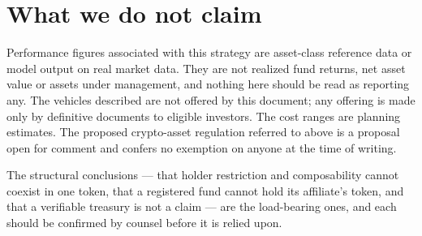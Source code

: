 \documentclass[11pt,a4paper]{article}
\begin{document}
\section{What we do not claim}

Performance figures associated with this strategy are asset-class reference data
or model output on real market data. They are not realized fund returns, net asset
value or assets under management, and nothing here should be read as reporting
any. The vehicles described are not offered by this document; any offering is made
only by definitive documents to eligible investors. The cost ranges are planning
estimates. The proposed crypto-asset regulation referred to above is a proposal
open for comment and confers no exemption on anyone at the time of writing.

The structural conclusions --- that holder restriction and composability cannot
coexist in one token, that a registered fund cannot hold its affiliate's token,
and that a verifiable treasury is not a claim --- are the load-bearing ones, and
each should be confirmed by counsel before it is relied upon.
\end{document}
